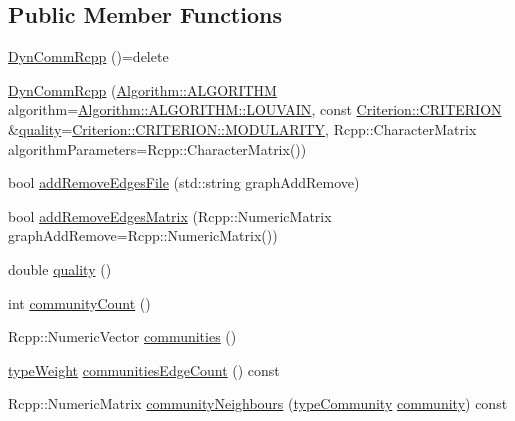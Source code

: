 \subsection*{Public Member Functions}
\begin{DoxyCompactItemize}
\item 
\hyperlink{classDynCommRcpp_a65289b1838009023b527237b64c073a2}{Dyn\+Comm\+Rcpp} ()=delete
\item 
\hyperlink{classDynCommRcpp_a1e3ae3a0be89f2a661dc09d7842a3ac7}{Dyn\+Comm\+Rcpp} (\hyperlink{classAlgorithm_a38e19a8c3dc51b97563a34d9e59a748d}{Algorithm\+::\+A\+L\+G\+O\+R\+I\+T\+HM} algorithm=\hyperlink{classAlgorithm_a38e19a8c3dc51b97563a34d9e59a748dab77e66715d6be972cdbf6cc4d990e732}{Algorithm\+::\+A\+L\+G\+O\+R\+I\+T\+H\+M\+::\+L\+O\+U\+V\+A\+IN}, const \hyperlink{classCriterion_a55594c223ce0837b8319c46c66cb648f}{Criterion\+::\+C\+R\+I\+T\+E\+R\+I\+ON} \&\hyperlink{classDynCommRcpp_a3d9d6845d9e67941da187bca511cdfcf}{quality}=\hyperlink{classCriterion_a55594c223ce0837b8319c46c66cb648fa2a7d416fbe43baf234420601ea73d946}{Criterion\+::\+C\+R\+I\+T\+E\+R\+I\+O\+N\+::\+M\+O\+D\+U\+L\+A\+R\+I\+TY}, Rcpp\+::\+Character\+Matrix algorithm\+Parameters=Rcpp\+::\+Character\+Matrix())
\item 
bool \hyperlink{classDynCommRcpp_a9080af5a73f77db6eff4d7a41596902a}{add\+Remove\+Edges\+File} (std\+::string graph\+Add\+Remove)
\item 
bool \hyperlink{classDynCommRcpp_ae9fb6b69740abb2d52721ec76d744811}{add\+Remove\+Edges\+Matrix} (Rcpp\+::\+Numeric\+Matrix graph\+Add\+Remove=Rcpp\+::\+Numeric\+Matrix())
\item 
double \hyperlink{classDynCommRcpp_a3d9d6845d9e67941da187bca511cdfcf}{quality} ()
\item 
int \hyperlink{classDynCommRcpp_a67948d5821c2ccffc4dbf47bac6fba70}{community\+Count} ()
\item 
Rcpp\+::\+Numeric\+Vector \hyperlink{classDynCommRcpp_ade6d5c2ebbb13f2efb3988d0d0ac2c1e}{communities} ()
\item 
\hyperlink{edge_8h_a2e7ea3be891ac8b52f749ec73fee6dd2}{type\+Weight} \hyperlink{classDynCommRcpp_a1a4622783fe2ed76e1c2321204b4b844}{communities\+Edge\+Count} () const
\item 
Rcpp\+::\+Numeric\+Matrix \hyperlink{classDynCommRcpp_ad23168e5fa7cf85d5508c646f3e39b9b}{community\+Neighbours} (\hyperlink{graphUndirectedGroupable_8h_a914da95c9ea7f14f4b7f875c36818556}{type\+Community} \hyperlink{classDynCommRcpp_ac3c8c1759d2ab106b757557e09834ec5}{community}) const
\item 

\end{DoxyCompactItemize}
